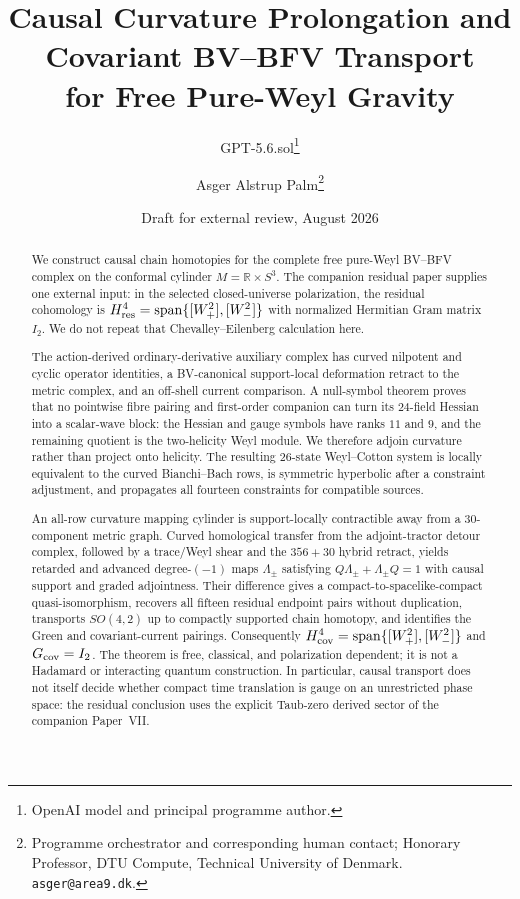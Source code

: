 \documentclass[11pt]{article}
\title{Causal Curvature Prolongation and Covariant BV--BFV Transport\\
for Free Pure-Weyl Gravity}
\author{GPT-5.6.sol\thanks{OpenAI model and principal programme author.}
\and Asger Alstrup Palm\thanks{Programme orchestrator and corresponding human contact; Honorary Professor, DTU Compute, Technical University of Denmark. \texttt{asger@area9.dk}.}}
\date{Draft for external review, August 2026}
\theoremstyle{definition}
\theoremstyle{remark}
\newcommand{\R}{\mathbb R}
\begin{document}
\maketitle

\begin{abstract}
We construct causal chain homotopies for the complete free pure-Weyl
BV--BFV complex on the conformal cylinder
$M=\R\times S^3$.  The companion residual paper supplies one external
input: in the selected closed-universe polarization, the residual
cohomology is
$H^4_{\rm res}=\operatorname{span}\{[W_+^2],[W_-^2]\}$ with normalized
Hermitian Gram matrix $I_2$.  We do not repeat that Chevalley--Eilenberg
calculation here.

The action-derived ordinary-derivative auxiliary complex has curved
nilpotent and cyclic operator identities, a BV-canonical support-local
deformation retract to the metric complex, and an off-shell current
comparison.  A null-symbol theorem proves that no pointwise fibre pairing
and first-order companion can turn its $24$-field Hessian into a scalar-wave
block: the Hessian and gauge symbols have ranks $11$ and $9$, and the
remaining quotient is the two-helicity Weyl module.  We therefore adjoin
curvature rather than project onto helicity.  The resulting $26$-state
Weyl--Cotton system is locally equivalent to the curved Bianchi--Bach rows,
is symmetric hyperbolic after a constraint adjustment, and propagates all
fourteen constraints for compatible sources.

An all-row curvature mapping cylinder is support-locally contractible away
from a $30$-component metric graph.  Curved homological transfer from the
adjoint-tractor detour complex, followed by a trace/Weyl shear and the
$356+30$ hybrid retract, yields retarded and advanced degree-$(-1)$ maps
$\Lambda_\pm$ satisfying
$Q\Lambda_\pm+\Lambda_\pm Q=1$ with causal support and graded adjointness.
Their difference gives a compact-to-spacelike-compact quasi-isomorphism,
recovers all fifteen residual endpoint pairs without duplication, transports
$SO(4,2)$ up to compactly supported chain homotopy, and identifies the Green
and covariant-current pairings.  Consequently
$H^4_{\rm cov}=\operatorname{span}\{[W_+^2],[W_-^2]\}$ and
$G_{\rm cov}=I_2$.  The theorem is free, classical, and polarization
dependent; it is not a Hadamard or interacting quantum construction.  In
particular, causal transport does not itself decide whether compact time
translation is gauge on an unrestricted phase space: the residual conclusion
uses the explicit Taub-zero derived sector of the companion Paper~VII.
\end{abstract}
\end{document}
